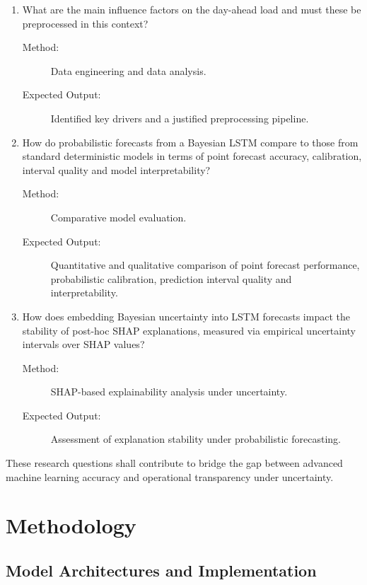 \documentclass[Master,english,IEEE]{twbook}
\begin{document}
\begin{enumerate}
  \item What are the main influence factors on the day-ahead load and must
  these be preprocessed in this context?
  \begin{description}
    \item[Method:] Data engineering and data analysis.
    \item[Expected Output:] Identified key drivers and a justified
    preprocessing pipeline.
  \end{description}

  \item How do probabilistic forecasts from a Bayesian LSTM compare to those
  from standard deterministic models in terms of point forecast accuracy,
  calibration, interval quality and model interpretability?
  \begin{description}
    \item[Method:] Comparative model evaluation.
    \item[Expected Output:] Quantitative and qualitative comparison of point forecast performance, probabilistic calibration, prediction interval quality and interpretability.
  \end{description}

  \item How does embedding Bayesian uncertainty into LSTM forecasts impact the
stability of post-hoc SHAP explanations, measured via empirical uncertainty
intervals over SHAP values?
  \begin{description}
    \item[Method:] SHAP-based explainability analysis under uncertainty.
    \item[Expected Output:] Assessment of explanation stability
    under probabilistic forecasting.
  \end{description}
\end{enumerate}

These research questions shall contribute to bridge the gap between advanced machine learning accuracy and operational transparency under uncertainty. 

\chapter{Methodology}


\section{Model Architectures and Implementation}
\end{document}
